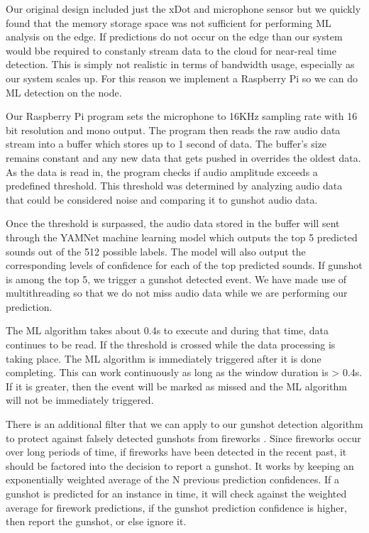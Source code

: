 \documentclass[conference]{IEEEtran}
\begin{document}
Our original design included just the xDot and microphone sensor but we quickly found that the memory storage space was not sufficient for performing ML analysis on the edge. If predictions do not occur on the edge than our system would bbe required to constanly stream data to the cloud for near-real time detection. This is simply not realistic in terms of bandwidth usage, especially as our system scales up.  For this reason we implement a Raspberry Pi so we can do ML detection on the node.

Our Raspberry Pi program sets the microphone to 16KHz sampling rate with 16 bit resolution and mono output. The program then reads the raw audio data stream into a buffer which stores up to 1 second of data. The buffer’s size remains constant and any new data that gets pushed in overrides the oldest data. As the data is read in, the program checks if audio amplitude exceeds a predefined threshold. This threshold was determined by analyzing audio data that could be considered noise and comparing it to gunshot audio data. 

Once the threshold is surpassed, the audio data stored in the buffer will sent through the YAMNet machine learning model which outputs the top 5 predicted sounds out of the 512 possible labels. The model will also output the corresponding levels of confidence for each of the top predicted sounds. If gunshot is among the top 5, we trigger a gunshot detected event.  We have made use of multithreading so that we do not miss audio data while we are performing our prediction. 

The ML algorithm takes about 0.4s to execute and during that time, data continues to be read. If the threshold is crossed while the data processing is taking place. The ML algorithm is immediately triggered after it is done completing. This can work continuously as long as the window duration is > 0.4s. If it is greater, then the event will be marked as missed and the ML algorithm will not be immediately triggered.

There is an additional filter that we can apply to our gunshot detection algorithm to protect against falsely detected gunshots from fireworks \cite{b8}. Since fireworks occur over long periods of time, if fireworks have been detected in the recent past, it should be factored into the decision to report a gunshot. It works by keeping an exponentially weighted average of the N previous prediction confidences. If a gunshot is predicted for an instance in time, it will check against the weighted average for firework predictions, if the gunshot prediction confidence is higher, then report the gunshot, or else ignore it.
\end{document}
